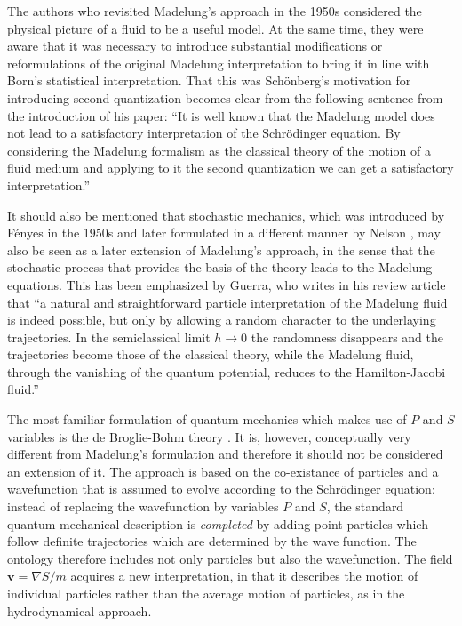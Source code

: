 \documentclass [12pt]{revtex4}
\begin{document}
The authors who revisited Madelung's approach in the 1950s considered the physical picture of a fluid to be a useful model. At the same time, they were aware that it was necessary to introduce substantial modifications or reformulations of the original Madelung interpretation to bring it in line with Born's statistical interpretation. That this was Sch\"{o}nberg's motivation for introducing second quantization becomes clear from the following sentence from the introduction of his paper: ``It is well known that the Madelung model does not lead to a satisfactory interpretation of the Schr\"{o}dinger equation. By considering the Madelung formalism as the classical theory of the motion of a fluid medium and applying to it the second quantization we can get a satisfactory interpretation.''

It should also be mentioned that stochastic mechanics, which was introduced by F\'{e}nyes \cite{F1952} in the 1950s and later formulated in a different manner by Nelson \cite{N1966}, may also be seen as a later extension of Madelung's approach, in the sense that the stochastic process that provides the basis of the theory leads to the Madelung equations. This has been emphasized by Guerra, who writes in his review article \cite{G1981} that ``a natural and straightforward particle interpretation of the Madelung fluid is indeed possible, but only by allowing a random character to the underlaying trajectories. In the semiclassical limit $h \rightarrow 0$ the randomness disappears and the trajectories become those of the classical theory, while the Madelung fluid, through the vanishing of the quantum potential, reduces to the Hamilton-Jacobi fluid.''

The most familiar formulation of quantum mechanics which makes use of $P$ and $S$ variables is the de Broglie-Bohm theory \cite{B1952,dB1926,dB1927,dB1927a}. It is, however, conceptually very different from Madelung's formulation and therefore it should not be considered an extension of it. The approach is based on the co-existance of particles and a wavefunction that is assumed to evolve according to the Schr\"{o}dinger equation: instead of replacing the wavefunction by variables $P$ and $S$, the standard quantum mechanical description is {\it completed} by adding point particles which follow definite trajectories which are determined by the wave function. The ontology therefore includes not only particles but also the wavefunction. The field $\textbf{v}=\nabla S/m$ acquires a new interpretation, in that it describes the motion of individual particles rather than the average motion of particles, as in the hydrodynamical approach.
\end{document}
